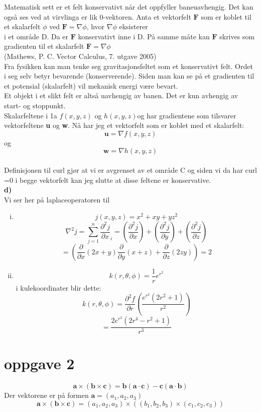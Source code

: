 \documentclass[11pt,a4paper, leqno]{report}
\newcommand{\partd}[1]{\frac {\partial} {\partial #1}}
\newcommand{\lapl}[2]{\frac {\partial^2 #1} {\partial #2}}
\begin{document}
Matematisk sett er et felt konservativt når det oppfyller baneuavhengig. Det kan også ses ved at virvlinga er lik 0-vektoren.
Anta et vektorfelt  $\mathbf{F}$ som er koblet til et skalarfelt $\phi$ ved $\mathbf{F}=\nabla \phi$, hvor $\nabla \phi$ eksisterer \\
i et område D. Da er $\mathbf{F}$ konservativt inne i D. På samme måte kan $\mathbf{F}$ skrives som gradienten til et skalarfelt $\mathbf{F}=\nabla \phi$
\\(Mathews, P. C. Vector Calculus, 7. utgave 2005)\\
Fra fysikken kan man tenke seg gravitasjonsfeltet som et konservativt felt. Ordet i seg selv betyr bevarende (konserverende).
 Siden man kan se på et gradienten til et potensial (skalarfelt) vil mekanisk energi være bevart. \\
Et objekt i et slikt felt er altså uavhengig av banen. Det er kun avhengig av start- og stoppunkt.  \\


Skalarfeltene i 1a $f(x,y,z)$ og $h(x,y,z) $og  har gradientene som tilsvarer vektorfeltene \textbf{u} og \textbf{w}. Nå har jeg et vektorfelt som er koblet med et skalarfelt:
$$\mathbf{u}=\nabla f(x,y,z)$$
og \\
$$\mathbf{w}=\nabla h(x,y,z)$$\\

Definisjonen til curl gjør at vi er avgrenset av et område C og siden vi da har curl =0 i begge vektorfelt kan jeg slutte at disse feltene er konservative.\\


 \textbf{d)}\\

Vi ser her på laplaceoperatoren til

\begin{enumerate}[(i)]
	\item
		$$ j(x, y, z)=x^2 + xy + yz^2$$
				$$\nabla^{2} j=\sum\limits_{j=1}^{n}\lapl j x_i=\left (\lapl j x \right) +\left(\lapl j y \right) +\left(\lapl j z \right)$$
		$$=\left (\partd x (2x+y) \partd y (x+z) + \partd z (2zy) \right )=2 $$
	\item
		$$ k(r, \theta, \phi)=\frac{1}{r} e^{r^{2}} $$
\newpage
i kulekoordinater blir dette:
$$k(r, \theta, \phi)=\lapl f r \left(\frac{e^{r^2}(2r^2+1)}{r^2}\right)$$
$$=\frac{2e^{r^2}(2r^4-r^2+1)}{r^3}$$

\end{enumerate}
\section{\textbf{oppgave 2}}
	$$\mathbf{a} \times (\mathbf{b} \times \mathbf{c})=\mathbf{b}(\mathbf{a} \cdot \mathbf{c}) - \mathbf{c}(\mathbf{a}  \cdot \mathbf{b})$$
Der vektorene er på formen $\mathbf{a}= (a_1,a_2, a_3)$\\
	$$\mathbf{a} \times (\mathbf{b} \times \mathbf{c})=(a_1,a_2, a_3) \times \left( (b_1,b_2, b_3) \times (c_1,c_2, c_3)\right)$$
\end{document}
